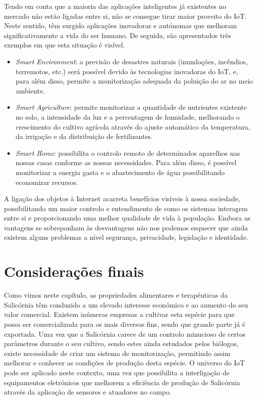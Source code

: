 Tendo em conta que a maioria das aplicações inteligentes já existentes no mercado não estão ligadas entre si, não se consegue tirar maior proveito do IoT. Neste sentido, têm surgido aplicações inovadoras e autónomas que melhoram significativamente a vida do ser humano\cite{Farooq2015}. De seguida, são apresentados três exemplos em que esta situação é visível. 


\begin{itemize}
	\item \textit{Smart Environment}: a previsão de desastres naturais (inundações, incêndios, terremotos, etc.) será possível devido às tecnologias inovadoras do IoT, e, para além disso, permite a monitorização adequada da poluição do ar no meio ambiente\cite{Farooq2015}.
		
	\item \textit{Smart Agriculture}: permite monitorizar a quantidade de nutrientes existente no solo, a intensidade da luz e a percentagem de humidade, melhorando o crescimento do cultivo agrícola através do ajuste automático da temperatura, da irrigação e da distribuição de fertilizantes\cite{-2013}.
	
	\item \textit{Smart Home}: possibilita o controlo remoto de determinados aparelhos nas nossas casas conforme as nossas necessidades. Para além disso, é possível monitorizar a energia gasta e o abastecimento de água possibilitando economizar recursos\cite{Farooq2015}. 
	 
\end{itemize}


A ligação dos objetos à Internet acarreta benefícios visíveis à nossa sociedade, possibilitando um maior controlo e entendimento de como os sistemas interagem entre si e proporcionando uma melhor qualidade de vida à população. Embora as vantagens se sobreponham às desvantagens não nos podemos esquecer que ainda existem alguns problemas a nível segurança, privacidade, legislação e identidade.


\section{Considerações finais}


Como vimos neste capítulo, as propriedades alimentares e terapêuticas da Salicórnia têm conduzido a um elevado interesse económico e ao aumento do seu valor comercial. Existem inúmeras empresas a cultivar esta espécie para que possa ser comercializada para os mais diversos fins, sendo que grande parte já é exportada. Uma vez que a Salicórnia carece de um controlo minucioso de certos parâmetros durante o seu cultivo, sendo estes ainda estudados pelos biólogos, existe necessidade de criar um sistema de monitorização, permitindo assim melhorar e conhecer as condições de produção desta espécie. O universo do \ac{IoT} pode ser aplicado neste contexto, uma vez que possibilita a interligação de equipamentos eletrónicos que melhorem a eficiência de produção de Salicórnia através da aplicação de sensores e atuadores no campo.  
